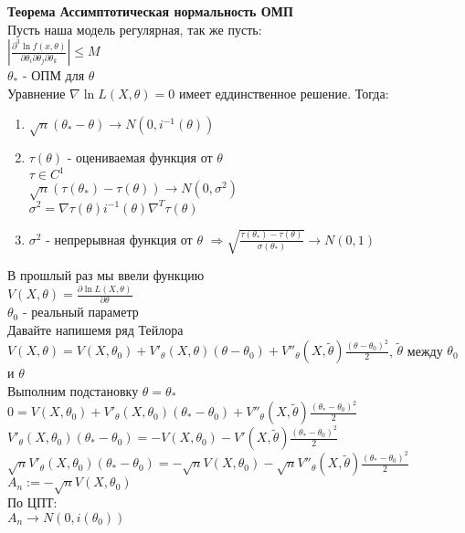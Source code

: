 \documentclass{article}
\newcommand\0{\mathbb{0}}
\newcommand\1{\mathbb{1}}
\newcommand{\Rto}{\Rightarrow}
\begin{document}
\textbf{Теорема Ассимптотическая нормальность ОМП}\\
Пусть наша модель регулярная, так же пусть:\\
$|\frac{\partial^3 \ln{f(x, \theta)}}{\partial \theta_i \partial \theta_j \partial \theta_k}| \leq M$\\
$\theta_*$ - ОПМ для $\theta$\\
Уравнение $\nabla \ln{L(X, \theta)} = 0$ имеет еддинственное решение.
Тогда:\\
\begin{enumerate}
    \item $\sqrt{n}(\theta_* - \theta) \to N(0, i^{-1}(\theta))$
    \item $\tau(\theta)$ - оцениваемая функция от $\theta$\\
    $\tau \in C^1$\\
    $\sqrt{n}(\tau(\theta_*) - \tau(\theta)) \to N(0, \sigma^2)$\\
    $\sigma^2 = \nabla\tau(\theta)i^{-1}(\theta)\nabla^T\tau(\theta)$
    \item $\sigma^2$ - непрерывная функция от $\theta$ $\Rto \sqrt{\frac{\tau(\theta_*) - \tau(\theta)}{\sigma(\theta_*)}} \to N(0, 1)$
\end{enumerate}
В прошлый раз мы ввели функцию\\
$V(X, \theta) = \frac{\partial\ln{L(X, \theta)}}{\partial\theta}$\\
$\theta_0$ - реальный параметр\\
Давайте напишемя ряд Тейлора\\
$V(X, \theta) = V(X, \theta_0) + V'_{\theta}(X, \theta)(\theta - \theta_0) + V''_{\theta}(X, \tilde\theta) \frac{(\theta - \theta_0)^2}{2}$, $\tilde{\theta}$ между $\theta_0$ и $\theta$\\
Выполним подстановку $\theta = \theta_*$\\
$0 = V(X, \theta_0) + V'_\theta(X, \theta_0)(\theta_* - \theta_0) + V''_\theta(X, \tilde{\theta})\frac{(\theta_* - \theta_0)^2}{2}$\\
$V'_\theta(X, \theta_0)(\theta_* - \theta_0) = -V(X, \theta_0) - V'(X, \tilde{\theta})\frac{(\theta_* - \theta_0)^2}{2}$\\
$\sqrt{n}V'_\theta(X, \theta_0)(\theta_* - \theta_0) = -\sqrt{n}V(X, \theta_0) - \sqrt{n}V''_\theta(X, \tilde{\theta})\frac{(\theta_* - \theta_0)^2}{2}$\\
$A_n := -\sqrt{n}V(X, \theta_0)$\\
По ЦПТ:\\
$A_n \to N(0, i(\theta_0))$\\
\end{document}
